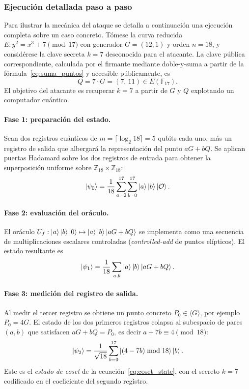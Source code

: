 \subsubsection{Ejecución detallada paso a paso}
\label{sec:shor_worked}

Para ilustrar la mecánica del ataque se detalla a continuación una ejecución completa sobre un caso concreto. Tómese la curva reducida $E: y^2 = x^3 + 7 \pmod{17}$ con generador $G = (12, 1)$ y orden $n = 18$, y considérese la clave secreta $k = 7$ desconocida para el atacante. La clave pública correspondiente, calculada por el firmante mediante doble-y-suma a partir de la fórmula~\eqref{eq:suma_puntos} y accesible públicamente, es
\begin{equation}
  Q = 7 \cdot G = (7,\, 11) \in E(\mathbb{F}_{17}).
  \label{eq:Q_example}
\end{equation}
El objetivo del atacante es recuperar $k = 7$ a partir de $G$ y $Q$ explotando un computador cuántico.

\paragraph{Fase 1: preparación del estado.} Sean dos registros cuánticos de $m = \lceil \log_2 18 \rceil = 5$ qubits cada uno, más un registro de salida que albergará la representación del punto $aG + bQ$. Se aplican puertas Hadamard sobre los dos registros de entrada para obtener la superposición uniforme sobre $\mathbb{Z}_{18} \times \mathbb{Z}_{18}$:
\begin{equation}
  \ket{\psi_0} = \frac{1}{18} \sum_{a=0}^{17} \sum_{b=0}^{17} \ket{a} \ket{b} \ket{\mathcal{O}}.
\end{equation}

\paragraph{Fase 2: evaluación del oráculo.} El oráculo $U_f: \ket{a}\ket{b}\ket{0} \mapsto \ket{a}\ket{b}\ket{aG + bQ}$ se implementa como una secuencia de multiplicaciones escalares controladas (\emph{controlled-add} de puntos elípticos). El estado resultante es
\begin{equation}
  \ket{\psi_1} = \frac{1}{18} \sum_{a, b} \ket{a}\ket{b} \ket{aG + bQ}.
\end{equation}

\paragraph{Fase 3: medición del registro de salida.} Al medir el tercer registro se obtiene un punto concreto $P_0 \in \langle G \rangle$, por ejemplo $P_0 = 4G$. El estado de los dos primeros registros colapsa al subespacio de pares $(a,b)$ que satisfacen $aG + bQ = P_0$, es decir $a + 7b \equiv 4 \pmod{18}$:
\begin{equation}
  \ket{\psi_2} = \frac{1}{\sqrt{18}} \sum_{b=0}^{17} \ket{(4 - 7b) \bmod 18} \ket{b}.
\end{equation}
Este es el \emph{estado de coset} de la ecuación~\eqref{eq:coset_state}, con el secreto $k=7$ codificado en el coeficiente del segundo registro.

